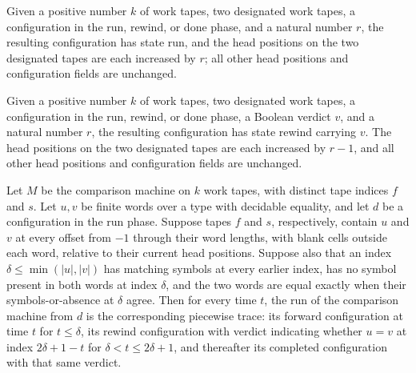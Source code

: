 \begin{definition}
\label{Turing.catalogCompareF}
\leanok
{}
Given a positive number $k$ of work tapes, two designated work tapes, a configuration in
the run, rewind, or done phase, and a natural number $r$, the resulting configuration
has state run, and the head positions on the two designated tapes are each increased by
$r$; all other head positions and configuration fields are unchanged.
\end{definition}

\begin{definition}
\label{Turing.catalogCompareR}
\leanok
{}
Given a positive number $k$ of work tapes, two designated work tapes, a configuration in
the run, rewind, or done phase, a Boolean verdict $v$, and a natural number $r$, the
resulting configuration has state rewind carrying $v$. The head positions on the two
designated tapes are each increased by $r-1$, and all other head positions and
configuration fields are unchanged.
\end{definition}

\begin{lemma}
\label{Turing.catalog_compare_trace}
\leanok
{}
Let $M$ be the comparison machine on $k$ work tapes, with distinct tape indices $f$ and
$s$. Let $u,v$ be finite words over a type with decidable equality, and let $d$ be a
configuration in the run phase. Suppose tapes $f$ and $s$, respectively, contain $u$ and
$v$ at every offset from $-1$ through their word lengths, with blank cells outside each
word, relative to their current head positions. Suppose also that an index
$\delta\le\min(|u|,|v|)$ has matching symbols at every earlier index, has no symbol
present in both words at index $\delta$, and the two words are equal exactly when their
symbols-or-absence at $\delta$ agree. Then for every time $t$, the run of the comparison
machine from $d$ is the corresponding piecewise trace: its forward configuration at time
$t$ for $t\le\delta$, its rewind configuration with verdict indicating whether $u=v$ at
index $2\delta+1-t$ for $\delta<t\le2\delta+1$, and thereafter its completed
configuration with that same verdict.
\end{lemma}

